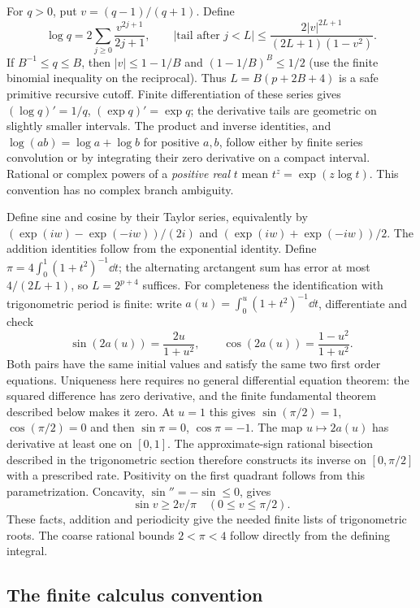 For $q>0$, put $v=(q-1)/(q+1)$. Define
\begin{equation}
 \log q=2\sum_{j\ge0}\frac{v^{2j+1}}{2j+1},\qquad
 |\text{tail after }j<L|\le
 \frac{2|v|^{2L+1}}{(2L+1)(1-v^2)}.\label{eq:log-alg}
\end{equation}
If $B^{-1}\le q\le B$, then $|v|\le1-1/B$ and
$(1-1/B)^B\le1/2$ (use the finite binomial inequality on the
reciprocal). Thus $L=B(p+2B+4)$ is a safe primitive recursive cutoff.
Finite differentiation of these series gives $(\log q)'=1/q$,
$(\exp q)'=\exp q$; the derivative tails are geometric on slightly
smaller intervals. The product and inverse identities, and
$\log(ab)=\log a+\log b$ for positive $a,b$, follow either by finite
series convolution or by integrating their zero derivative on a compact
interval. Rational or complex powers of a \emph{positive real} $t$ mean
$t^z=\exp(z\log t)$. This convention has no complex branch ambiguity.

Define sine and cosine by their Taylor series, equivalently by
$(\exp(iw)-\exp(-iw))/(2i)$ and
$(\exp(iw)+\exp(-iw))/2$. The addition identities follow from the
exponential identity. Define
$\pi=4\int_0^1(1+t^2)^{-1}\dd t$; the alternating arctangent sum has
error at most $4/(2L+1)$, so $L=2^{p+4}$ suffices.
For completeness the identification with trigonometric period is finite:
write $a(u)=\int_0^u(1+t^2)^{-1}\dd t$, differentiate and check
\[
 \sin(2a(u))=\frac{2u}{1+u^2},\qquad
 \cos(2a(u))=\frac{1-u^2}{1+u^2}.
\]
Both pairs have the same initial values and satisfy the same two first
order equations. Uniqueness here requires no general differential
equation theorem: the squared difference has zero derivative, and the
finite fundamental theorem described below makes it zero. At $u=1$ this
gives $\sin(\pi/2)=1$, $\cos(\pi/2)=0$ and then
$\sin\pi=0$, $\cos\pi=-1$. The map $u\mapsto2a(u)$ has derivative
at least one on $[0,1]$. The approximate-sign rational bisection described
in the trigonometric section therefore constructs its inverse on
$[0,\pi/2]$ with a prescribed rate. Positivity on the first quadrant
follows from this parametrization. Concavity, $\sin''=-\sin\le0$, gives
\begin{equation}
 \sin v\ge2v/\pi\quad(0\le v\le\pi/2).\label{eq:sine-chord}
\end{equation}
These facts, addition and periodicity give the needed finite lists of
trigonometric roots. The coarse rational bounds $2<\pi<4$ follow directly
from the defining integral.

\subsection{The finite calculus convention}
\label{sec:finite-calculus}


